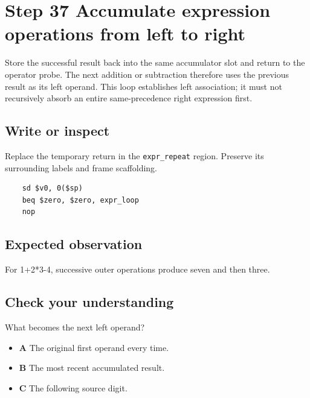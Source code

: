 \section{Step 37 Accumulate expression operations from left to right}\label{expression-s37}

Store the successful result back into the same accumulator slot and return to the operator probe. The next addition or subtraction therefore uses the previous result as its left operand. This loop establishes left association; it must not recursively absorb an entire same-precedence right expression first.

\subsection{Write or inspect}
Replace the temporary return in the \texttt{expr\_repeat} region. Preserve its surrounding labels and frame scaffolding.

\begin{verbatim}
    sd $v0, 0($sp)
    beq $zero, $zero, expr_loop
    nop
\end{verbatim}
\subsection{Expected observation}
For 1+2*3-4, successive outer operations produce seven and then three.

\subsection{Check your understanding}
What becomes the next left operand?

\begin{itemize}
  \item \textbf{A} The original first operand every time.
  \item \textbf{B} The most recent accumulated result.
  \item \textbf{C} The following source digit.
\end{itemize}
